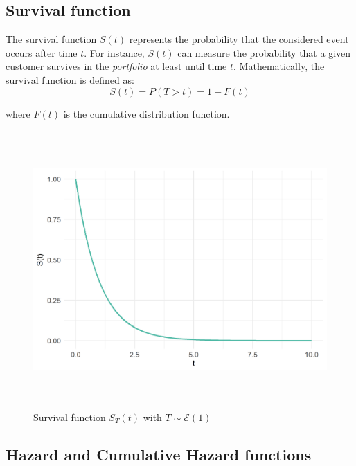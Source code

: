 \documentclass[
]{book}
\begin{document}
\hypertarget{survival-function}{%
\subsection{Survival function}\label{survival-function}}

The survival function \(S(t)\) represents the probability that the considered event occurs after time \(t\). For instance, \(S(t)\) can measure the probability that a given customer survives in the \emph{portfolio} at least until time \(t\). Mathematically, the survival function is defined as:
\begin{equation}
  S(t) = P(T > t) = 1 - F(t)
  \label{eq:survfun}
\end{equation}

where \(F(t)\) is the cumulative distribution function.

\begin{figure}

{\centering \includegraphics[width=400pt,height=300pt]{./imgs/surv_fun_plot} 

}

\caption{Survival function $S_T(t)$ with $T \sim \mathcal{E} (1)$}\label{fig:survfunplot}
\end{figure}

\hypertarget{hazard-and-cumulative-hazard-functions}{%
\subsection{Hazard and Cumulative Hazard functions}\label{hazard-and-cumulative-hazard-functions}}
\end{document}
